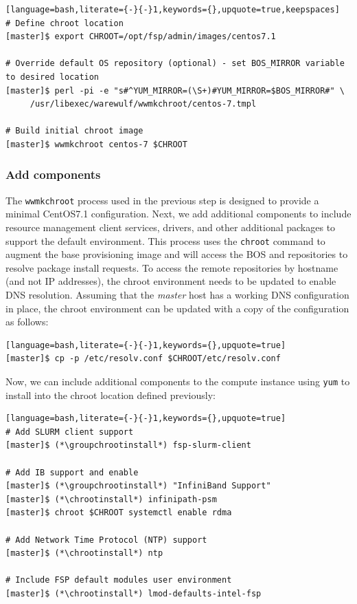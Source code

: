 \documentclass[letterpaper]{article}
\newcommand{\baseOS}{CentOS7.1}
\newcommand{\chrootinstall}{yum -y --installroot=\$CHROOT install}
\newcommand{\groupchrootinstall}{yum -y --installroot=\$CHROOT groupinstall}
\begin{document}
\begin{lstlisting}[language=bash,literate={-}{-}1,keywords={},upquote=true,keepspaces]
# Define chroot location 
[master]$ export CHROOT=/opt/fsp/admin/images/centos7.1

# Override default OS repository (optional) - set BOS_MIRROR variable to desired location
[master]$ perl -pi -e "s#^YUM_MIRROR=(\S+)#YUM_MIRROR=$BOS_MIRROR#" \
     /usr/libexec/warewulf/wwmkchroot/centos-7.tmpl

# Build initial chroot image
[master]$ wwmkchroot centos-7 $CHROOT
\end{lstlisting}

\subsubsection{Add \FSP{} components} \label{sec:add_components}

The \texttt{wwmkchroot} process used in the previous step is designed to
provide a minimal \baseOS{} configuration. Next, we add additional components to
include resource management client services, \InfiniBand{} drivers, and other
additional packages to support the default \FSP{} environment.  This process uses
the \texttt{chroot} command to augment the base provisioning image and will
access the BOS and \FSP{} repositories to resolve package install requests. To
access the remote repositories by hostname (and not IP addresses), the chroot
environment needs to be updated to enable DNS resolution. Assuming that
the {\em master} host has a working DNS configuration in place, the chroot environment can
be updated with a copy of the configuration as follows:

\begin{lstlisting}[language=bash,literate={-}{-}1,keywords={},upquote=true]
[master]$ cp -p /etc/resolv.conf $CHROOT/etc/resolv.conf
\end{lstlisting}

Now, we can include additional components to the compute instance using
\texttt{yum} to install into the chroot location defined previously:

\begin{lstlisting}[language=bash,literate={-}{-}1,keywords={},upquote=true]
# Add SLURM client support
[master]$ (*\groupchrootinstall*) fsp-slurm-client

# Add IB support and enable
[master]$ (*\groupchrootinstall*) "InfiniBand Support"
[master]$ (*\chrootinstall*) infinipath-psm
[master]$ chroot $CHROOT systemctl enable rdma

# Add Network Time Protocol (NTP) support
[master]$ (*\chrootinstall*) ntp

# Include FSP default modules user environment
[master]$ (*\chrootinstall*) lmod-defaults-intel-fsp
\end{lstlisting}
\end{document}
